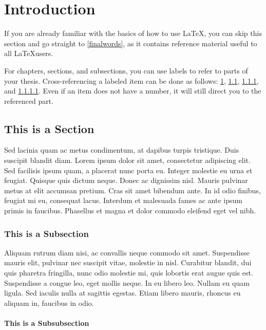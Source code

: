 \chapter{Introduction}\label{chap:somechapter}

If you are already familiar with the basics of how to use \LaTeX, you can skip this section and go straight to \ref{finalwords}, as it contains reference material useful to all \LaTeX users.

For chapters, sections, and subsections, you can use labels to refer to parts of your thesis. Cross-referencing a labeled item can be done as follows: \ref{chap:somechapter}, \ref{sec:somesection}, \ref{sub:somesubsection}, and \ref{ssub:somesubsubsection}. Even if an item does not have a number, it will still direct you to the referenced part.

\section{This is a Section}\label{sec:somesection}

Sed lacinia quam ac metus condimentum, at dapibus turpis tristique. Duis suscipit blandit diam. Lorem ipsum dolor sit amet, consectetur adipiscing elit. Sed facilisis ipsum quam, a placerat nunc porta eu. Integer molestie eu urna et feugiat. Quisque quis dictum neque. Donec ac dignissim nisl. Mauris pulvinar metus at elit accumsan pretium. Cras sit amet bibendum ante. In id odio finibus, feugiat mi eu, consequat lacus. Interdum et malesuada fames ac ante ipsum primis in faucibus. Phasellus et magna et dolor commodo eleifend eget vel nibh.

\subsection{This is a Subsection}\label{sub:somesubsection}

Aliquam rutrum diam nisi, ac convallis neque commodo sit amet. Suspendisse mauris elit, pulvinar nec suscipit vitae, molestie in nisl. Curabitur blandit, dui quis pharetra fringilla, nunc odio molestie mi, quis lobortis erat augue quis est. Suspendisse a congue leo, eget mollis neque. In eu libero leo. Nullam eu quam ligula. Sed iaculis nulla at sagittis egestas. Etiam libero mauris, rhoncus eu aliquam in, faucibus in odio.

\subsubsection{This is a Subsubsection}\label{ssub:somesubsubsection}

